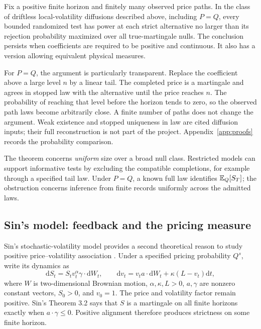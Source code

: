 \begin{theorem}\label{thm:nogo}
Fix a positive finite horizon and finitely many observed price paths. In the
class of driftless local-volatility diffusions described above, including
$P=Q$, every bounded randomized test has power at each strict alternative no
larger than its rejection probability maximized over all true-martingale
nulls. The conclusion persists when coefficients are required to be positive
and continuous. It also has a version allowing equivalent physical measures.
\end{theorem}

For $P=Q$, the argument is particularly transparent. Replace the coefficient
above a large level $n$ by a linear tail. The completed price is a martingale
and agrees in stopped law with the alternative until the price reaches $n$.
The probability of reaching that level before the horizon tends to zero, so
the observed path laws become arbitrarily close. A finite number of paths
does not change the argument. Weak existence and stopped uniqueness in law
are cited diffusion inputs; their full reconstruction is not part of the
project. Appendix~\ref{app:proofs} records the probability comparison.

The theorem concerns \emph{uniform} size over a broad null class.
Restricted models can support informative tests by excluding the compatible
completions, for example through a specified tail law. Under $P=Q$, a known
full law identifies $\mathbb{E}_Q[S_T]$; the obstruction concerns inference from
finite records uniformly across the admitted laws.

\subsection{Sin's model: feedback and the pricing measure}\label{sec:sin}
Sin's stochastic-volatility model provides a second theoretical reason to
study positive price--volatility association \cite{sin1995complications}.
Under a specified pricing probability $Q^s$, write its dynamics as
\begin{equation}\label{eq:sin}
 \mathrm{d}S_t=S_t v_t^\alpha\gamma\cdot\mathrm{d}W_t,\qquad
 \mathrm{d}v_t=v_t a\cdot\mathrm{d}W_t+\kappa(L-v_t)\mathrm{d}t,
\end{equation}
where $W$ is two-dimensional Brownian motion, $\alpha,\kappa,L>0$,
$a,\gamma$ are nonzero constant vectors, $S_0>0$, and $v_0=1$.
The price and volatility factor remain positive. Sin's Theorem 3.2 says
that $S$ is a martingale on all finite horizons exactly when
$a\cdot\gamma\leq0$. Positive alignment therefore produces strictness
on some finite horizon.


